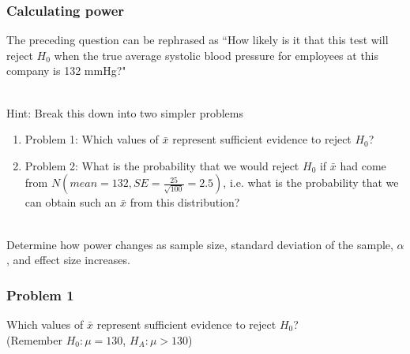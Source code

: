 
\begin{frame}
\frametitle{Calculating power}

The preceding question can be rephrased as ``How likely is it that this test will reject $H_0$ when the true average systolic blood pressure for employees at this company is 132 mmHg?"

~\\
\pause
Hint: Break this down into two simpler problems
\pause
\begin{enumerate}
\item Problem 1: Which values of $\bar{x}$ represent sufficient evidence to reject $H_0$?
\pause
\item Problem 2: What is the probability that we would reject $H_0$ if $\bar{x}$ had come from $N\left(mean = 132, SE = \frac{25}{\sqrt{100}} = 2.5\right)$, i.e. what is the probability that we can obtain such an $\bar{x}$ from this distribution?
\end{enumerate}
\vspace{-2mm}
~\\
\pause
Determine how power changes as sample size, standard deviation of the sample, $\alpha$, and effect size increases.


\end{frame}



\begin{frame}
\frametitle{Problem 1}

Which values of $\bar{x}$ represent sufficient evidence to reject $H_0$? \\
(Remember $H_0: \mu = 130$, $H_A: \mu > 130$)

\end{frame}

